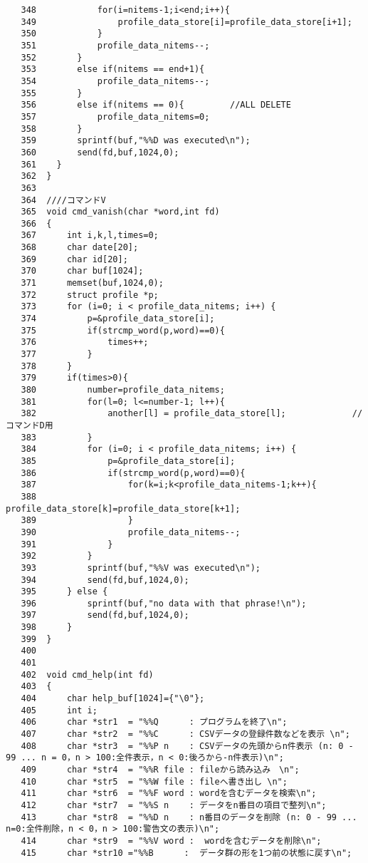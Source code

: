 \documentclass{jarticle}[11pt]
\begin{document}
\begin{itemize}
\begin{verbatim}
   348	          for(i=nitems-1;i<end;i++){
   349	              profile_data_store[i]=profile_data_store[i+1];  
   350	          }
   351	          profile_data_nitems--;
   352	      }
   353	      else if(nitems == end+1){
   354	          profile_data_nitems--;
   355	      }
   356	      else if(nitems == 0){         //ALL DELETE
   357	          profile_data_nitems=0;
   358	      }
   359	      sprintf(buf,"%%D was executed\n");
   360	      send(fd,buf,1024,0);
   361	  }
   362	}
   363	
   364	////コマンドV
   365	void cmd_vanish(char *word,int fd)
   366	{
   367	    int i,k,l,times=0;
   368	    char date[20];
   369	    char id[20];
   370	    char buf[1024];
   371	    memset(buf,1024,0);
   372	    struct profile *p;
   373	    for (i=0; i < profile_data_nitems; i++) {
   374	        p=&profile_data_store[i];
   375	        if(strcmp_word(p,word)==0){
   376	            times++;
   377	        }
   378	    }
   379	    if(times>0){
   380	        number=profile_data_nitems;
   381	        for(l=0; l<=number-1; l++){
   382	            another[l] = profile_data_store[l];             //コマンドD用
   383	        }
   384	        for (i=0; i < profile_data_nitems; i++) {
   385	            p=&profile_data_store[i];
   386	            if(strcmp_word(p,word)==0){
   387	                for(k=i;k<profile_data_nitems-1;k++){
   388	                    profile_data_store[k]=profile_data_store[k+1];  
   389	                }
   390	                profile_data_nitems--;
   391	            }
   392	        }
   393	        sprintf(buf,"%%V was executed\n");
   394	        send(fd,buf,1024,0);
   395	    } else {
   396	        sprintf(buf,"no data with that phrase!\n");
   397	        send(fd,buf,1024,0);
   398	    }
   399	}
   400	
   401	
   402	void cmd_help(int fd)
   403	{
   404	    char help_buf[1024]={"\0"};
   405	    int i;
   406	    char *str1  = "%%Q      : プログラムを終了\n";   
   407	    char *str2  = "%%C      : CSVデータの登録件数などを表示 \n";
   408	    char *str3  = "%%P n    : CSVデータの先頭からn件表示 (n: 0 - 99 ... n = 0，n > 100:全件表示，n < 0:後ろから-n件表示)\n";
   409	    char *str4  = "%%R file : fileから読み込み　\n";
   410	    char *str5  = "%%W file : fileへ書き出し \n";
   411	    char *str6  = "%%F word : wordを含むデータを検索\n";     
   412	    char *str7  = "%%S n    : データをn番目の項目で整列\n";   
   413	    char *str8  = "%%D n    : n番目のデータを削除 (n: 0 - 99 ... n=0:全件削除，n < 0，n > 100:警告文の表示)\n"; 
   414	    char *str9  = "%%V word :  wordを含むデータを削除\n";
   415	    char *str10 ="%%B      :  データ群の形を1つ前の状態に戻す\n";

\end{verbatim}
\end{itemize}
\end{document}
